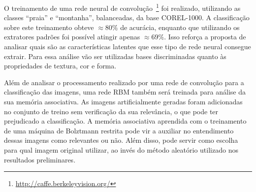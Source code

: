 O treinamento de uma rede neural de convolução~\footnote{\url{http://caffe.berkeleyvision.org/}} foi realizado, utilizando as classes ``praia'' e ``montanha'', balanceadas, da base COREL-1000. A classificação sobre este treinamento obteve $\approx 80\%$ de acurácia, enquanto que utilizando os extratores padrões foi possível atingir apenas $\approx 69\%$. Isso reforça a proposta de analisar quais são as características latentes que esse tipo de rede neural consegue extrair. Para essa análise vão ser utilizadas bases discriminadas quanto às propriedades de textura, cor e forma.

Além de analisar o processamento realizado por uma rede de convolução para a classificação das imagens, uma rede RBM também será treinada para análise da sua memória associativa. As imagens artificialmente geradas foram adicionadas no conjunto de treino sem verificação da sua relevância, o que pode ter prejudicado a classificação. A memória associativa aprendida com o treinamento de uma máquina de Bolztmann restrita pode vir a auxiliar no entendimento dessas imagens como relevantes ou não. Além disso, pode servir como escolha para qual imagem original utilizar, ao invés do método aleatório utilizado nos resultados preliminares.

